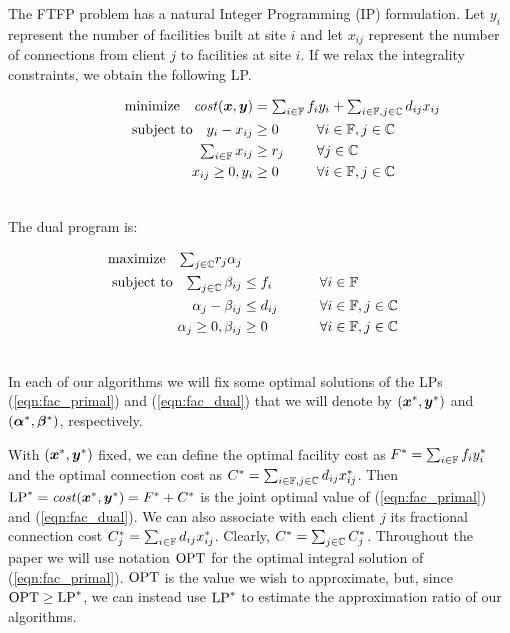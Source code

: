 \documentclass[oneside,final]{ucr}
\begin{document}
The FTFP problem has a natural Integer Programming (IP)
formulation. Let $y_i$ represent the number of facilities
built at site $i$ and let $x_{ij}$ represent the number of
connections from client $j$ to facilities at site $i$. If we
relax the integrality constraints, we obtain the following
LP.

\begin{alignat}{3}
  \textrm{minimize} \quad \cost(\bfx,\bfy) &= \textstyle{\sum_{i\in \sitesset}f_iy_i 
								+ \sum_{i\in \sitesset, j\in \clientset}d_{ij}x_{ij}}\label{eqn:fac_primal}\hspace{-1.5in}&&
									\\ \notag
  \textrm{subject to}\quad y_i - x_{ij} &\geq 0 			&\quad 		&\forall i\in \sitesset, j\in \clientset 
									\\ \notag
     \textstyle{\sum_{i\in \sitesset} x_{ij}} &\geq r_j  &			&\forall j\in \clientset
 									\\ \notag
  	  x_{ij} \geq 0, y_i &\geq 0 						& 			&\forall i\in \sitesset, j\in \clientset 
  									\\ \notag
\end{alignat}


\noindent
The dual program is:

\begin{alignat}{3}
  \textrm{maximize}\quad \textstyle{\sum_{j\in \mathbb{C}}} r_j\alpha_j&\label{eqn:fac_dual}  
     						\\ \notag
  \textrm{subject to} \quad \textstyle{
    \sum_{j\in \mathbb{C}}\beta_{ij}} &\leq f_i  &\quad\quad			&\forall i \in \mathbb{F}  
							\\ \notag
  \alpha_{j} - \beta_{ij} 	&\leq  d_{ij}       &                 & \forall i\in \mathbb{F}, j\in \mathbb{C} 
							\\ \notag
  \alpha_j \geq 0, \beta_{ij} &\geq 0           &            & \forall i\in \mathbb{F}, j\in \mathbb{C}
  							\\ \notag
\end{alignat}

In each of our algorithms we will fix some optimal
solutions of the LPs (\ref{eqn:fac_primal}) and (\ref{eqn:fac_dual})
that we will denote by $(\boldsymbol{x}^\ast, \boldsymbol{y}^\ast)$ and
$(\boldsymbol{\alpha}^\ast,\boldsymbol{\beta}^\ast)$, respectively.

With $(\boldsymbol{x}^\ast, \boldsymbol{y}^\ast)$ fixed, we can define the
optimal facility cost as $F^\ast=\sum_{i\in\mathbb{F}} f_i
y_i^\ast$ and the optimal connection cost as $C^\ast =
\sum_{i\in\mathbb{F},j\in\mathbb{C}} d_{ij}x_{ij}^\ast$.
Then $\mbox{\rm LP}^\ast = {\it cost}(\boldsymbol{x}^\ast,\boldsymbol{y}^\ast) = F^\ast+C^\ast$
is the joint optimal value of (\ref{eqn:fac_primal}) and
(\ref{eqn:fac_dual}).  We can also associate with each
client $j$ its fractional connection cost $C^\ast_j =
\sum_{i\in\mathbb{F}} d_{ij}x_{ij}^\ast$.  Clearly, $C^\ast =
\sum_{j\in\mathbb{C}} C^\ast_j$.  Throughout the paper we
will use notation $\mbox{\rm OPT}$ for the optimal integral solution
of (\ref{eqn:fac_primal}).  $\mbox{\rm OPT}$ is the value we wish to
approximate, but, since $\mbox{\rm OPT}\ge\mbox{\rm LP}^\ast$, we can instead use
$\mbox{\rm LP}^\ast$ to estimate the approximation ratio of our
algorithms.
\end{document}
